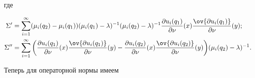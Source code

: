 где 


\begin{align*} 


\Sigma'&=\sum^\infty_{i=1}(\mu_i(q_2)-\mu_i(q_1)) 


(\mu_i(q_1)-\lambda)^{-1} 


(\mu_i(q_2)-\lambda)^{-1} 


\frac{\partial u_i(q_1)}{\partial\nu}(x) 


\frac{\ov{\partial u_i(q_1)}}{\partial\nu}(y);\\ 


% 


\Sigma''&=\sum^\infty_{i=1}\bigg( 


\frac{\partial u_i(q_1)}{\partial\nu}(x) 


\frac{\ov{\partial u_i(q_1)}}{\partial\nu}(y)- 


\frac{\partial u_i(q_2)}{\partial\nu}(x) 


\frac{\ov{\partial u_i(q_2)}}{\partial\nu}(y)\bigg) 


(\mu_i(q_2)-\lambda)^{-1}. 


\end{align*} 


Теперь для операторной нормы имеем 


